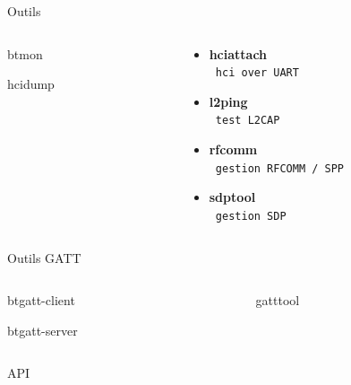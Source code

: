 \begin{frame}[fragile]
\begin{center}\huge Outils\end{center}
	\begin{columns}[t]
		\begin{column}{0.50\linewidth}
			\begin{block}{btmon}
			\end{block}
			\begin{block}{hcidump}
			\end{block}
		\end{column}
		\begin{column}{0.50\linewidth}
			\begin{itemize}
				\item \textbf{hciattach} \\ \verb+ hci over UART+
				\item \textbf{l2ping} \\ \verb+ test L2CAP+
				\item \textbf{rfcomm} \\ \verb+ gestion RFCOMM / SPP+
				\item \textbf{sdptool} \\ \verb+ gestion SDP+
			\end{itemize}
		\end{column}
	\end{columns}
\end{frame}


\begin{frame}
\begin{center}\huge Outils GATT\end{center}
	\begin{columns}[t]
		\begin{column}{0.50\linewidth}
			\begin{block}{btgatt-client}
			\end{block}
			\begin{block}{btgatt-server}
			\end{block}
		\end{column}
		\begin{column}{0.50\linewidth}
			\begin{block}{gatttool}
			\end{block}
		\end{column}
	\end{columns}
\end{frame}


\begin{frame}
API
\end{frame}


